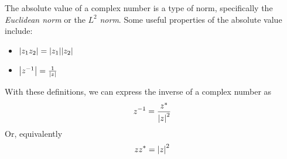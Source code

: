 \documentclass[10pt]{scrartcl}
\numberwithin{equation}{subsection}
\theoremstyle{definition}
\theoremstyle{remark}
\newcommand{\inv}[1]{
		{#1}^{-1}
	}
\newcommand*{\conj}[1]{{#1}^*}
\begin{document}
The absolute value of a complex number is a type of norm, specifically the
\textit{Euclidean norm} or the $L^2$ \textit{norm}. 
Some useful properties of the absolute value include:
\begin{itemize}
	\item $\abs{z_1 z_2} = \abs{z_1} \abs{z_2}$
	\item $\abs{\inv{z}} = \frac{1}{\abs{z}}$
\end{itemize}
With these definitions, we can express the inverse of a complex number as
\begin{equation}
	\inv{z} = \frac{\conj{z}}{\abs{z}^2}
\end{equation}
Or, equivalently
\begin{equation}
	z \conj{z} = \abs{z}^2
\end{equation}
\end{document}
